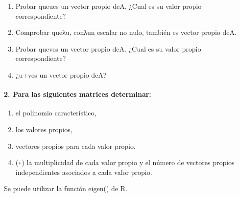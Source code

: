 \documentclass[]{article}
\providecommand{\tightlist}{%
  \setlength{\itemsep}{0pt}\setlength{\parskip}{0pt}}
\let\oldparagraph\paragraph
\renewcommand{\paragraph}[1]{\oldparagraph{#1}\mbox{}}
\begin{document}
\begin{enumerate}
\def\labelenumi{\alph{enumi})}
\tightlist
\item
  Probar queues un vector propio deA. ¿Cual es su valor propio
  correspondiente?
\item
  Comprobar queλu, conλun escalar no nulo, también es vector propio deA.
\item
  Probar queves un vector propio deA. ¿Cual es su valor propio
  correspondiente?
\item
  ¿u+ves un vector propio deA?
\end{enumerate}

\hypertarget{para-las-siguientes-matrices-determinar}{%
\paragraph{2. Para las siguientes matrices
determinar:}\label{para-las-siguientes-matrices-determinar}}

\begin{enumerate}
\def\labelenumi{\alph{enumi})}
\tightlist
\item
  el polinomio característico,
\item
  los valores propios,
\item
  vectores propios para cada valor propio,
\item
  (∗) la multiplicidad de cada valor propio y el número de vectores
  propios independientes asociados a cada valor propio.
\end{enumerate}

Se puede utilizar la función eigen() de R.
\end{document}
